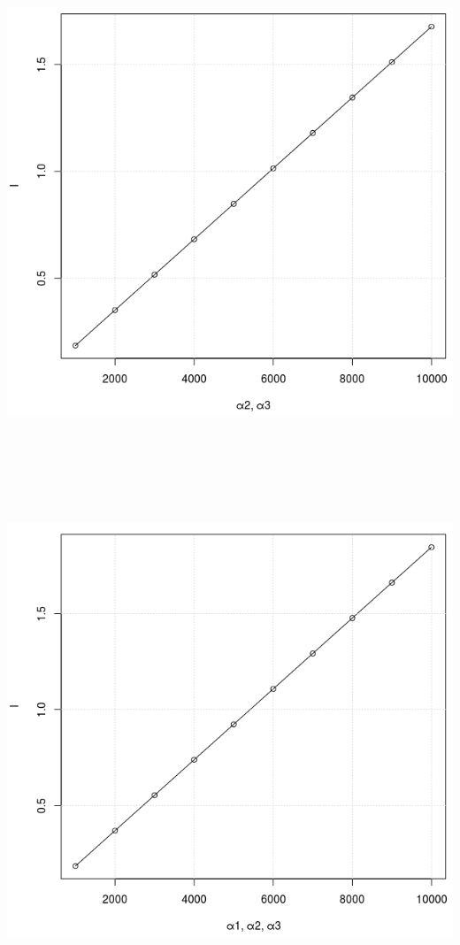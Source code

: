 \documentclass[14pt]{extreport}
\begin{document}
\newpage
\begin{landscape}
\begin{center}
\includegraphics[width=15cm, height=15cm]{laa2.png}
\end{center}
\end{landscape}

\newpage
\begin{landscape}
\begin{center}
\includegraphics[width=15cm, height=15cm]{laa3.png}
\end{center}
\end{landscape}
\end{document}
